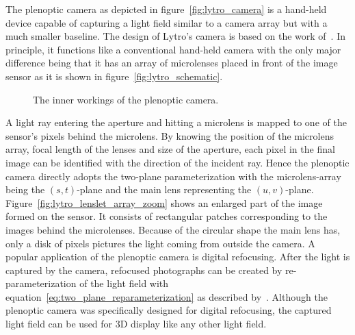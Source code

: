 The plenoptic camera as depicted in figure~\ref{fig:lytro_camera} is a hand-held device capable of capturing a light field similar to a camera array but with a much smaller baseline.
The design of Lytro's camera is based on the work of~\cite{LightFieldPhotographyHandHeldPlenopticCamera}.
In principle, it functions like a conventional hand-held camera with the only major difference being that it has an array of microlenses placed in front of the image sensor as it is shown in figure~\ref{fig:lytro_schematic}.
\begin{figure}[tb]
	\centering
	\hfill%
	 
	\vspace{0.15cm}

					{}\hfill%
	\caption[The inner workings of the plenoptic camera]
			{The inner workings of the plenoptic camera.}
	\label{fig:how_lytro_works}
\end{figure}
A light ray entering the aperture and hitting a microlens is mapped to one of the sensor's pixels behind the microlens.
By knowing the position of the microlens array, focal length of the lenses and size of the aperture, each pixel in the final image can be identified with the direction of the incident ray. 
Hence the plenoptic camera directly adopts the two-plane parameterization with the microlens-array being the \mbox{$(s, t)$-plane} and the main lens representing the \mbox{$(u, v)$-plane}.
Figure~\ref{fig:lytro_lenslet_array_zoom} shows an enlarged part of the image formed on the sensor.
It consists of rectangular patches corresponding to the images behind the microlenses.
Because of the circular shape the main lens has, only a disk of pixels pictures the light coming from outside the camera.
A popular application of the plenoptic camera is digital refocusing.
After the light is captured by the camera, refocused photographs can be created by re-parameterization of the light field with equation~\ref{eq:two_plane_reparameterization} as described by~\cite{LightFieldPhotographyHandHeldPlenopticCamera}.
Although the plenoptic camera was specifically designed for digital refocusing, the captured light field can be used for 3D display like any other light field.
